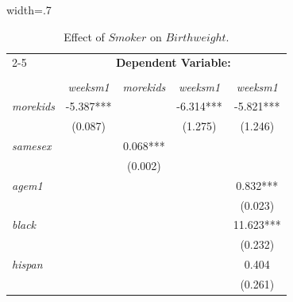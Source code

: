 \documentclass{article}
\begin{document}
\begin{table}[hp!]
\centering
\caption{Effect of $Smoker$ on $Birthweight$.}\vspace{.25cm}
\begin{adjustbox}{width=.7\textwidth}
\begin{tabular}{l|cccc|}
\cline{2-5}
\multicolumn{1}{c|}{}                   & \multicolumn{4}{c|}{ \small \textbf{Dependent Variable:} }                                        \\
                                        & \multicolumn{1}{l}{} & \multicolumn{1}{l}{} & \multicolumn{1}{l}{} & \multicolumn{1}{l|}{} \\
                                        & \textit{weeksm1}     & \textit{morekids}    & \textit{weeksm1}     & \textit{weeksm1}      \\ \hline
\multicolumn{1}{|l|}{\textit{morekids}} & -5.387***            &                      & -6.314***            & -5.821***             \\
\multicolumn{1}{|l|}{\textit{}}         & (0.087)              &                      & (1.275)              & (1.246)               \\
\multicolumn{1}{|l|}{\textit{samesex}}  &                      & 0.068***             &                      &                       \\
\multicolumn{1}{|l|}{\textit{}}         &                      & (0.002)              &                      &                       \\
\multicolumn{1}{|l|}{\textit{agem1}}    &                      &                      &                      & 0.832***              \\
\multicolumn{1}{|l|}{\textit{}}         &                      &                      &                      & (0.023)               \\
\multicolumn{1}{|l|}{\textit{black}}    &                      &                      &                      & 11.623***             \\
\multicolumn{1}{|l|}{\textit{}}         &                      &                      &                      & (0.232)               \\
\multicolumn{1}{|l|}{\textit{hispan}}   &                      &                      &                      & 0.404                 \\
\multicolumn{1}{|l|}{\textit{}}         &                      &                      &                      & (0.261)               \\

\end{tabular}
\end{adjustbox}
\end{table}
\end{document}
